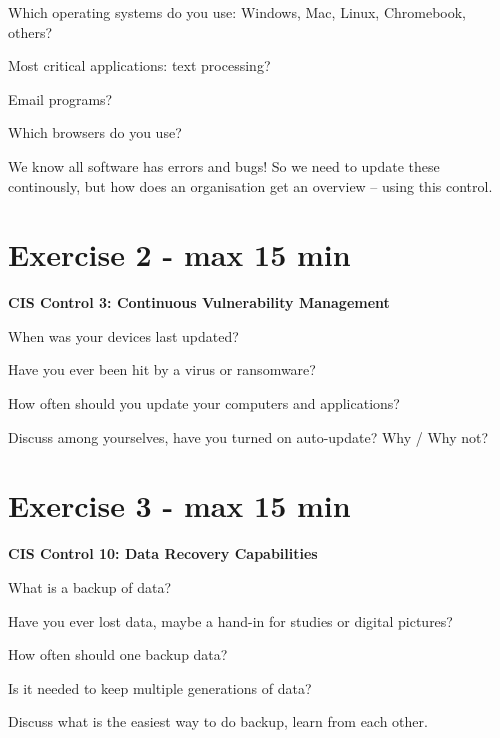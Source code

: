 \documentclass[a4paper,11pt,notitlepage,landscape]{report}
\begin{document}
\begin{list1}
\item[\faSquareO] Which operating systems do you use: Windows, Mac, Linux, Chromebook, others?
\item[\faSquareO] Most critical applications: text processing?
\item[\faSquareO] Email programs?
\item[\faSquareO] Which browsers do you use?
\end{list1}

We know all software has errors and bugs! So we need to update these continously, but how does an organisation get an overview -- using this control.

\eject

\section*{Exercise 2 - max 15 min}

{\bf CIS Control 3: Continuous Vulnerability Management}
\begin{list1}
\item[\faSquareO] When was your devices last updated?
\item[\faSquareO] Have you ever been hit by a virus or ransomware?
\item[\faSquareO] How often should you update your computers and applications?
\end{list1}

Discuss among yourselves, have you turned on auto-update? Why / Why not?


\eject

\section*{Exercise 3 - max 15 min}


{\bf CIS Control 10: Data Recovery Capabilities}

\begin{list1}
\item[\faSquareO] What is a backup of data?
\item[\faSquareO] Have you ever lost data, maybe a hand-in for studies or digital pictures?
\item[\faSquareO] How often should one backup data?
\item[\faSquareO] Is it needed to keep multiple generations of data?
\end{list1}

Discuss what is the easiest way to do backup, learn from each other.
\end{document}
